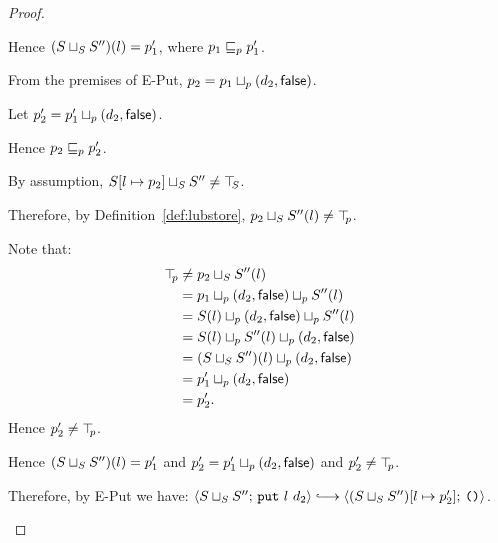 \begin{proof}
\begin{itemize}
\begin{itemize}
          Hence $(S \sqcup_{S} S'')(l) = p'_1$, where $p_1 \sqsubseteq_p
          p'_1$.

          From the premises of {\sc E-Put}, $p_2 =
          p_1 \sqcup_p (d_2, \textsf{false})$.

          Let $p'_2 = p'_1 \sqcup_p (d_2, \textsf{false})$.

          Hence $p_2 \sqsubseteq_p p'_2$.

          By assumption, $S[l \mapsto p_2] \sqcup_{S} S'' \neq
          \top\hspace{-0.85mm}_{S}$.

          Therefore, by Definition~\ref{def:lubstore},
          $p_2 \sqcup_{S} S''(l) \neq \top\hspace{-0.85mm}_{p}$.

          Note that:
          \begin{align*}
            \top\hspace{-0.85mm}_{p} &\neq p_2 \sqcup_{S} S''(l) \\
            &= p_1 \sqcup_p (d_2, \textsf{false}) \sqcup_p S''(l) \\
            &= S(l) \sqcup_p (d_2, \textsf{false}) \sqcup_p S''(l) \\
            &= S(l) \sqcup_p S''(l) \sqcup_p (d_2, \textsf{false}) \\
            &= (S \sqcup_{S} S'')(l) \sqcup_p (d_2, \textsf{false}) \\
            &= p'_1 \sqcup_p (d_2, \textsf{false}) \\
            &= p'_2. \\
          \end{align*}
          Hence $p'_2 \neq \top\hspace{-0.85mm}_{p}$.

          Hence $(S \sqcup_{S} S'')(l) = p'_1$ and $p'_2 =
          p'_1 \sqcup_p (d_2, \textsf{false})$ and $p'_2 \neq
          \top\hspace{-0.85mm}_{p}$.

          Therefore, by {\sc E-Put} we have:
          $\config{\lubstore{S}{S''}}{\putexp{l}{d_2}} \parstepsto
          \config{\extSRaw{(\lubstore{S}{S''})}{l}{p'_2}}{\unit}$.



\end{itemize}
\end{itemize}
\end{proof}

